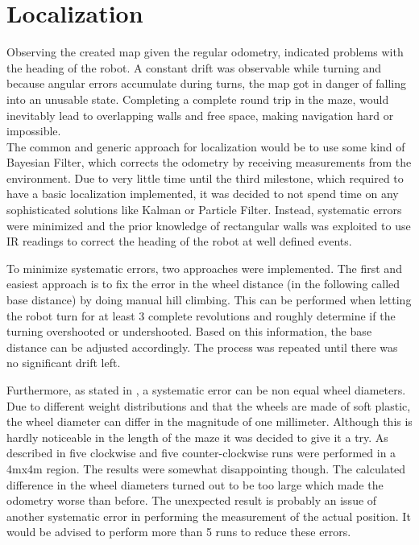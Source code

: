 \section{Localization}

Observing the created map given the regular odometry, indicated problems with the heading of the robot.
A constant drift was observable while turning and because angular errors accumulate during turns,
the map got in danger of falling into an unusable state.
Completing a complete round trip in the maze, would inevitably lead to overlapping walls and free space,
making navigation hard or impossible.\\

The common and generic approach for localization would be to use some kind of Bayesian Filter,
which corrects the odometry by receiving measurements from the environment.
Due to very little time until the third milestone, which required to have a basic localization implemented,
it was decided to not spend time on any sophisticated solutions like Kalman or Particle Filter.
Instead, systematic errors were minimized and the prior knowledge of rectangular walls was exploited to use IR readings to correct
the heading of the robot at well defined events.

To minimize systematic errors, two approaches were implemented.
The first and easiest approach is to fix the error in the wheel distance (in the following called base distance) by doing manual hill climbing.
This can be performed when letting the robot turn for at least 3 complete revolutions and roughly determine if the turning overshooted or undershooted.
Based on this information, the base distance can be adjusted accordingly.
The process was repeated until there was no significant drift left.

Furthermore, as stated in \cite{OdomCorr}, a systematic error can be non equal wheel diameters.
Due to different weight distributions and that the wheels are made of soft plastic, 
the wheel diameter can differ in the magnitude of one millimeter. 
Although this is hardly noticeable in the length of the maze it was decided to give it a try.
As described in \cite{OdomCorr} five clockwise and five counter-clockwise runs were performed in a 4mx4m region.
The results were somewhat disappointing though. 
The calculated difference in the wheel diameters turned out to be too large which made the odometry worse than before.
The unexpected result is probably an issue of another systematic error in performing the measurement of the actual position.
It would be advised to perform more than 5 runs to reduce these errors.

